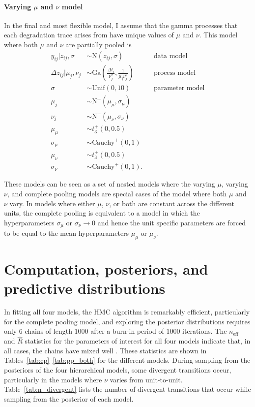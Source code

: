 \paragraph{Varying $\mu$ and $\nu$ model} In the final and most flexible model, I assume that the gamma processes that each degradation trace arises from have unique values of $\mu$ and $\nu$. This model where both $\mu$ and $\nu$ are partially pooled is
\begin{align*} 
   y_{ij}|z_{ij}, \sigma & \sim \mbox{N}(z_{ij}, \sigma)  && \mbox{data model} \\
   \Delta z_{ij}|\mu_j, \nu_j & \sim \mbox{Ga} \left( \frac{\Delta t_{i}}{\nu_j^2}, \frac{1}{\mu_j \nu_j^2} \right) && \mbox{process model} \\
   \sigma & \sim \mbox{Unif}(0, 10) && \mbox{parameter model} \\
   \mu_j & \sim \mbox{N}^{+}(\mu_{\mu}, \sigma_{\mu}) \\
   \nu_j & \sim \mbox{N}^{+}(\mu_{\nu}, \sigma_{\nu}) \\
   \mu_{\mu} & \sim t^{+}_3(0, 0.5) \\
   \sigma_{\mu} & \sim \mbox{Cauchy}^{+}(0, 1) \\
   \mu_{\nu} & \sim t^{+}_3(0, 0.5) \\
   \sigma_{\nu} & \sim \mbox{Cauchy}^{+}(0, 1).
\end{align*}

These models can be seen as a set of nested models where the varying $\mu$, varying $\nu$, and complete pooling models are special cases of the model where both $\mu$ and $\nu$ vary. In models where either $\mu$, $\nu$, or both are constant across the different units, the complete pooling is equivalent to a model in which the hyperparameters $\sigma_\mu$ or $\sigma_\nu \longrightarrow 0$ and hence the unit specific parameters are forced to be equal to the mean hyperparameters $\mu_\mu$ or $\mu_\nu$.

\section{Computation, posteriors, and predictive distributions} \label{sec:unit-to-unit-sampling}

In fitting all four models, the HMC algorithm is remarkably efficient, particularly for the complete pooling model, and exploring the posterior distributions requires only 6 chains of length 1000 after a burn-in period of 1000 iterations. The $n_{\mbox{eff}}$ and $\hat{R}$ statistics for the parameters of interest for all four models indicate that, in all cases, the chains have mixed well \citep{Vehtari_2021}. These statistics are shown in Tables~\ref{tab:cp}--\ref{tab:pp_both} for the different models. During sampling from the posteriors of the four hierarchical models, some divergent transitions occur, particularly in the models where $\nu$ varies from unit-to-unit. Table~\ref{tab:n_divergent} lists the number of divergent transitions that occur while sampling from the posterior of each model.

